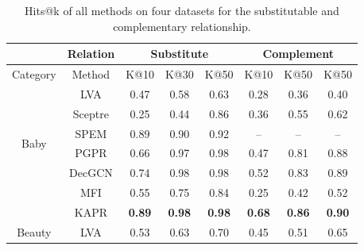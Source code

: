 \documentclass[review]{elsarticle}
\begin{document}
\begin{sloppypar}
\begin{table}[]
\centering
\small
\caption{Hits@k of all methods on four datasets for the substitutable and complementary relationship.}
\begin{tabular}{c|c|ccc|ccc}
\hline
                             & Relation & \multicolumn{3}{c|}{Substitute}                  & \multicolumn{3}{c}{Complement}                  \\ \hline
Category                     & Method   & K@10           & K@30           & K@50           & K@10          & K@50           & K@50           \\ \hline
\multirow{6}{*}{Baby}        & LVA      & 0.47           & 0.58           & 0.63           & 0.28          & 0.36           & 0.40           \\
                             & Sceptre  & 0.25           & 0.44           & 0.86           & 0.36          & 0.55           & 0.62           \\
                             & SPEM     & 0.89           & 0.90           & 0.92           & --             & --              & --              \\
                             & PGPR     & 0.66          & 0.97          & 0.98          & 0.47         & 0.81          & 0.88          \\
                             & DecGCN   & 0.74           & 0.98           & 0.98          & 0.52         & 0.83           &0.89            \\
                             & MFI      & 0.55           & 0.75           & 0.84           & 0.25          & 0.42           & 0.52           \\
                             & KAPR     & \textbf{0.89}  & \textbf{0.98}  & \textbf{0.98}  & \textbf{0.68} & \textbf{0.86}  & \textbf{0.90}  \\ \hline
\multirow{6}{*}{Beauty}      & LVA      & 0.53           & 0.63           & 0.70           & 0.45          & 0.51           & 0.65           \\

\end{tabular}
\end{table}
\end{sloppypar}
\end{document}
